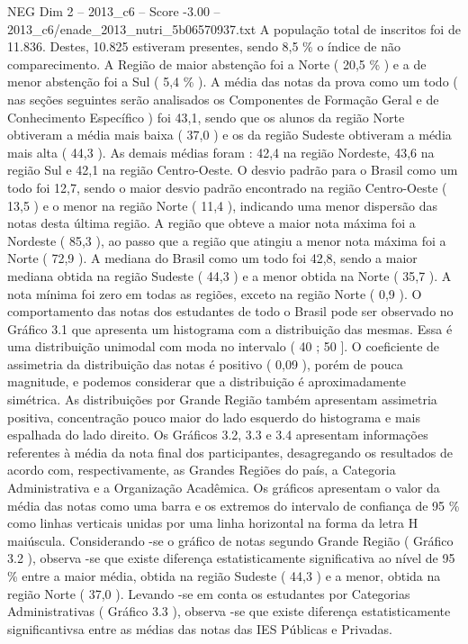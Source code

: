 \begin{textsample}{NEG Dim 2 – 2013\_c6 – Score -3.00 – 2013\_c6/enade\_2013\_nutri\_5b06570937.txt}
A população total de inscritos foi de 11.836.
Destes, 10.825 estiveram presentes, sendo 8,5 \% o índice de não comparecimento.
A Região de maior abstenção foi a Norte ( 20,5 \% ) e a de menor abstenção foi a Sul ( 5,4 \% ).
A média das notas da prova como um todo ( nas seções seguintes serão analisados os Componentes de Formação Geral e de Conhecimento Específico ) foi 43,1, sendo que os alunos da região Norte obtiveram a média mais baixa ( 37,0 ) e os da região Sudeste obtiveram a média mais alta ( 44,3 ).
As demais médias foram : 42,4 na região Nordeste, 43,6 na região Sul e 42,1 na região Centro-Oeste.
O desvio padrão para o Brasil como um todo foi 12,7, sendo o maior desvio padrão encontrado na região Centro-Oeste ( 13,5 ) e o menor na região Norte ( 11,4 ), indicando uma menor dispersão das notas desta última região.
A região que obteve a maior nota máxima foi a Nordeste ( 85,3 ), ao passo que a região que atingiu a menor nota máxima foi a Norte ( 72,9 ).
A mediana do Brasil como um todo foi 42,8, sendo a maior mediana obtida na região Sudeste ( 44,3 ) e a menor obtida na Norte ( 35,7 ).
A nota mínima foi zero em todas as regiões, exceto na região Norte ( 0,9 ).
O comportamento das notas dos estudantes de todo o Brasil pode ser observado no Gráfico 3.1 que apresenta um histograma com a distribuição das mesmas.
Essa é uma distribuição unimodal com moda no intervalo ( 40 ; 50 ].
O coeficiente de assimetria da distribuição das notas é positivo ( 0,09 ), porém de pouca magnitude, e podemos considerar que a distribuição é aproximadamente simétrica.
As distribuições por Grande Região também apresentam assimetria positiva, concentração pouco maior do lado esquerdo do histograma e mais espalhada do lado direito.
Os Gráficos 3.2, 3.3 e 3.4 apresentam informações referentes à média da nota final dos participantes, desagregando os resultados de acordo com, respectivamente, as Grandes Regiões do país, a Categoria Administrativa e a Organização Acadêmica.
Os gráficos apresentam o valor da média das notas como uma barra e os extremos do intervalo de confiança de 95 \% como linhas verticais unidas por uma linha horizontal na forma da letra H maiúscula.
Considerando -se o gráfico de notas segundo Grande Região ( Gráfico 3.2 ), observa -se que existe diferença estatisticamente significativa ao nível de 95 \% entre a maior média, obtida na região Sudeste ( 44,3 ) e a menor, obtida na região Norte ( 37,0 ).
Levando -se em conta os estudantes por Categorias Administrativas ( Gráfico 3.3 ), observa -se que existe diferença estatisticamente significantivsa entre as médias das notas das IES Públicas e Privadas.

\end{textsample}

